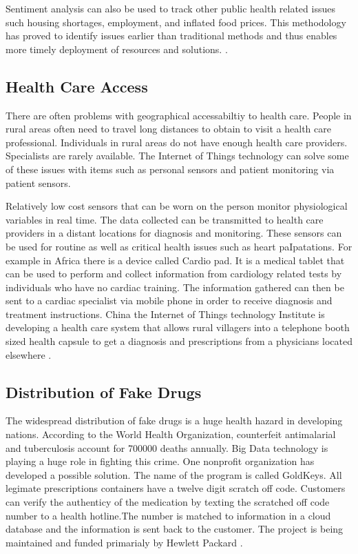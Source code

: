 \documentclass[sigconf]{acmart}
\begin{document}
Sentiment analysis can also be used to track other public health related issues such housing shortages, employment, and inflated food prices.  This methodology has proved to identify issues earlier than traditional methods and thus enables more timely deployment of resources and solutions. \cite{www-google-GloPls}. 

\subsection{Health Care Access}
There are often problems with geographical accessabiltiy to health care. People in rural areas often need to travel long distances to obtain to visit a health care professional. Individuals in rural areas do not have enough health care providers. Specialists are rarely available. The Internet of Things technology can solve some of these issues with items such as personal sensors and patient monitoring via patient sensors. 

Relatively low cost sensors that can be worn on the person monitor physiological variables in real time.  The data collected can be transmitted to health care providers in a distant locations for diagnosis and monitoring. These sensors can be used for routine as well as critical health issues such as heart paIpatations. For example in Africa there is a device called Cardio pad. It is a medical  tablet that can be used to perform and collect information from cardiology related tests by individuals who have no cardiac training. The information gathered can then be sent to a cardiac specialist via mobile phone in order to receive diagnosis and treatment instructions. China the Internet of Things technology Institute is developing a health care system that allows rural villagers into a telephone booth sized health capsule to get a diagnosis and prescriptions from a physicians located elsewhere \cite{DevEcon}. 

\subsection{Distribution of Fake Drugs}
The widespread distribution of fake drugs is a huge health hazard in developing nations. According to the World Health Organization, counterfeit antimalarial and tuberculosis account for 700000 deaths annually. Big Data technology is playing a huge role in fighting this crime. One nonprofit organization has developed a possible solution. The name of the program is called GoldKeys. All legimate prescriptions containers have a twelve digit scratch off code. Customers can verify the authenticy of the medication by texting the scratched off code number to a health hotline.The number is matched to information in a cloud database and the information is sent back to the customer. The project is being maintained and funded primarialy by Hewlett Packard \cite{DevEcon}. 
\end{document}
